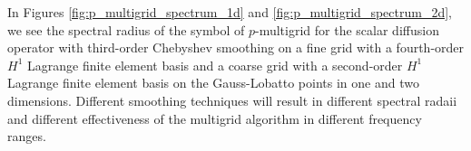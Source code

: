 In Figures \ref{fig:p_multigrid_spectrum_1d} and \ref{fig:p_multigrid_spectrum_2d}, we see the spectral radius of the symbol of $p$-multigrid for the scalar diffusion operator with third-order Chebyshev smoothing on a fine grid with a fourth-order $H^1$ Lagrange finite element basis and a coarse grid with a second-order $H^1$ Lagrange finite element basis on the Gauss-Lobatto points in one and two dimensions.
Different smoothing techniques will result in different spectral radaii and different effectiveness of the multigrid algorithm in different frequency ranges.